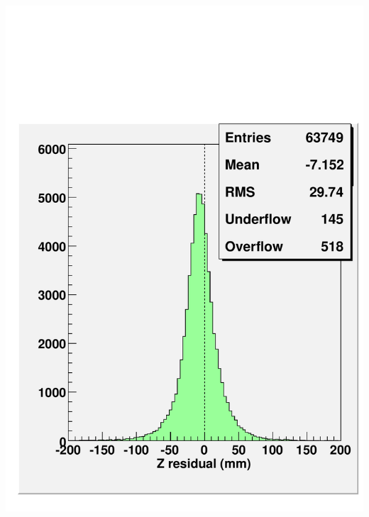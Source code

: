 \documentclass[compress]{beamer}
\begin{document}
\begin{frame}
\begin{columns}
\includegraphics[width=\linewidth]{oparameter_whm2.pdf}
\end{columns}
\end{frame}

\end{document}
